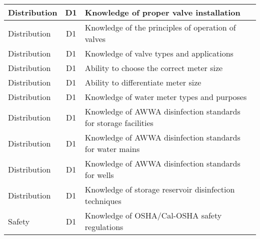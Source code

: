 \documentclass{article}
\begin{document}
\begin{table}[]
\begin{tabular}{|l|c|l|}
Distribution                           & D1             & Knowledge of proper   valve installation                                                                                          \\ \hline
Distribution                           & D1             & Knowledge of the   principles of operation of valves                                                                              \\ \hline
Distribution                           & D1             & Knowledge of valve   types and applications                                                                                       \\ \hline
Distribution                           & D1             & Ability to choose the   correct meter size                                                                                        \\ \hline
Distribution                           & D1             & Ability to   differentiate meter size                                                                                             \\ \hline
Distribution                           & D1             & Knowledge of water   meter types and purposes                                                                                     \\ \hline
Distribution                           & D1             & Knowledge of AWWA   disinfection standards for storage facilities                                                                 \\ \hline
Distribution                           & D1             & Knowledge of AWWA   disinfection standards for water mains                                                                        \\ \hline
Distribution                           & D1             & Knowledge of AWWA   disinfection standards for wells                                                                              \\ \hline
Distribution                           & D1             & Knowledge of storage   reservoir disinfection techniques                                                                          \\ \hline
Safety                                 & D1             & Knowledge of   OSHA/Cal-OSHA safety regulations                                                                                   \\ \hline

\end{tabular}
\end{table}
\end{document}
